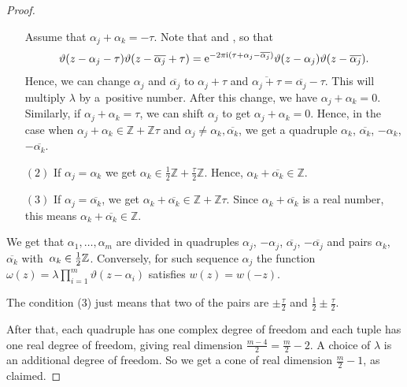 \documentclass[pdftex]{sigma}
\newcommand\ZZ{\mathbb{Z}}
\let\Re\relax
\DeclareMathOperator\Re{Re}
\newcommand{\ovl}{\overline}
\numberwithin{equation}{section}
\theoremstyle{definition}
\begin{document}
\begin{proof}
\begin{enumerate}
Assume that $\alpha_j+\alpha_k=-\tau$. Note that  and \smash{$\vartheta(z-\ovl{\alpha_j}+\tau)={\rm e}^{-\pi {\rm i}(\tau+2z-2\ovl{\alpha_j})}\vartheta(z-\ovl{\alpha_j})$}, so that
\[\vartheta(z-\alpha_j-\tau)\vartheta(z-\ovl{\alpha_j}+\tau)={\rm e}^{-2\pi {\rm i} (\tau+\alpha_j-\ovl{\alpha_j})}\vartheta(z-\alpha_j)\vartheta(z-\ovl{\alpha_j}).\] Hence, we can change $\alpha_j$ and $\ovl{\alpha_j}$ to $\alpha_j+\tau$ and $\ovl{\alpha_j+\tau}=\ovl{\alpha_j}-\tau$. This will multiply $\lambda$ by a~positive number.
 After this change, we have $\alpha_j+\alpha_k=0$. Similarly, if $\alpha_j+\alpha_k=\tau$, we can shift $\alpha_j$ to get $\alpha_j+\alpha_k=0$.
Hence, in the case when $\alpha_j+\alpha_k\in \ZZ+\ZZ\tau$ and $\alpha_j\neq \alpha_k,\ovl{\alpha_k}$, we get a quadruple $\alpha_k$, $\ovl{\alpha_k}$, $-\alpha_k$, $-\ovl{\alpha_k}$.
 \item[$(2)$]
 If $\alpha_j=\alpha_k$ we get $\alpha_k\in \tfrac{1}{2}\ZZ+\frac{\tau}{2}\ZZ$. Hence, $\alpha_k+\ovl{\alpha_k}\in \ZZ$.
 \item[$(3)$]
 If $\alpha_j=\ovl{\alpha_k}$, we get $\alpha_k+\ovl{\alpha_k}\in \ZZ+\ZZ\tau$. Since $\alpha_k+\ovl{\alpha_k}$ is a real number, this means $\alpha_k+\ovl{\alpha_k}\in \ZZ$.
 \end{enumerate}

We get that $\alpha_1,\dots,\alpha_m$ are divided in quadruples $\alpha_j$, $-\alpha_j$, $\ovl{\alpha_j}$, $-\ovl{\alpha_j}$ and pairs $\alpha_k$, $\ovl{\alpha_k}$ with~$\Re\alpha_k\in \tfrac{1}{2}\ZZ$. Conversely, for such sequence $\alpha_j$ the function $\omega(z)=\lambda \prod_{i=1}^m \vartheta(z-\alpha_i)$ satisfies $w(z)=w(-z)$.

The condition (3) just means that two of the pairs are $\pm\frac{\tau}{2}$ and $\frac{1}{2}\pm\frac{\tau}{2}$.

After that, each quadruple has one complex degree of freedom and each tuple has one real degree of freedom, giving real dimension $\frac{m-4}{2}=\frac{m}{2}-2$. A choice of $\lambda$ is an additional degree of freedom. So we get a cone of real dimension $\frac{m}{2}-1$, as claimed.
 \end{proof}
\end{document}
